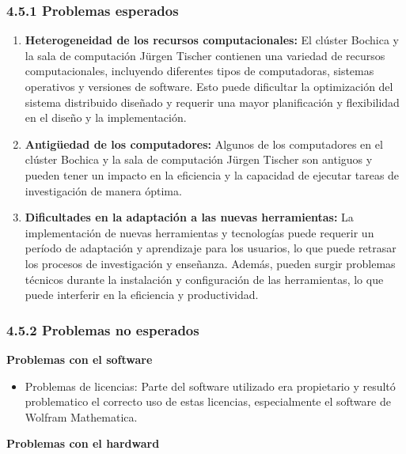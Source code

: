 \begin{spacing}{1.5}
\subsubsection{4.5.1 Problemas esperados}

\begin{enumerate}
    \item \textbf{Heterogeneidad de los recursos computacionales:} El clúster Bochica y la sala de computación Jürgen Tischer contienen una variedad de recursos computacionales, incluyendo diferentes tipos de computadoras, sistemas operativos y versiones de software. Esto puede dificultar la optimización del sistema distribuido diseñado y requerir una mayor planificación y flexibilidad en el diseño y la implementación.
    \item \textbf{Antigüedad de los computadores:} Algunos de los computadores en el clúster Bochica y la sala de computación Jürgen Tischer son antiguos y pueden tener un impacto en la eficiencia y la capacidad de ejecutar tareas de investigación de manera óptima.
    \item \textbf{Dificultades en la adaptación a las nuevas herramientas:} La implementación de nuevas herramientas y tecnologías puede requerir un período de adaptación y aprendizaje para los usuarios, lo que puede retrasar los procesos de investigación y enseñanza. Además, pueden surgir problemas técnicos durante la instalación y configuración de las herramientas, lo que puede interferir en la eficiencia y productividad.
\end{enumerate}

    \subsubsection{4.5.2 Problemas no esperados}

    \textbf{Problemas con el software}

    \begin{itemize}
        \item Problemas de licencias: Parte del software utilizado era propietario y resultó problematico el correcto uso de estas licencias, especialmente el software de Wolfram Mathematica.
    \end{itemize}


    \textbf{Problemas con el hardward}


\end{spacing}
